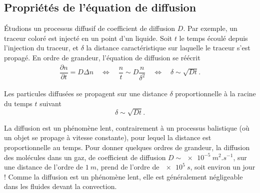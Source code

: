 \documentclass[12pt,fancy]{cours}
\begin{document}
\subsection{Propriétés de l'équation de diffusion}

Étudions un processus diffusif de coefficient de diffusion $D$. Par exemple, un traceur coloré est injecté en un point  d’un liquide. Soit $t$ le temps écoulé depuis l’injection du traceur, et $\delta$ la distance caractéristique sur laquelle le traceur s’est propagé. En ordre de grandeur, l'équation de diffusion se réécrit
\begin{equation}
\begin{split}
\dfrac{\partial n}{\partial t}=D\Delta n \quad\Leftrightarrow\quad\dfrac{n}{t}\sim D\dfrac{n}{\delta^{2}} \quad\Leftrightarrow\quad \delta \sim \sqrt{Dt}.
\end{split}
\end{equation}

\begin{prop}\label{prop:delta}
Les particules diffusées se propagent sur une distance $\delta$ proportionnelle à la racine du temps $t$ suivant
$$\delta \sim \sqrt{Dt}.$$
\end{prop}
\noindent La diffusion est un phénomène lent, contrairement à un processus balistique (où un objet se propage à vitesse constante), pour lequel la distance est proportionnelle au temps.
Pour donner quelques ordres de grandeur, la diffusion des molécules dans un gaz, de coefficient de diffusion $D\sim\SI{e-5}{m^2.s^{-1}}$, sur une distance de l'ordre de $\SI{1}{m}$, prend de l'ordre de $\SI{e5}{s}$, soit environ un jour ! Comme la diffusion est un phénomène lent, elle est généralement négligeable dans les fluides devant la convection.

\medskip
\end{document}

